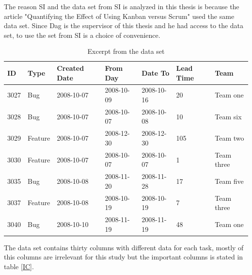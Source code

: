 \documentclass[UKenglish]{ifimaster}  %
\begin{document}
The reason SI and the data set from SI is analyzed in this thesis is because the article "Quantifying the Effect of Using Kanban versus Scrum" \parencite{Dag} used the same data set. Since Dag is the supervisor of this thesis and he had access to the data set, to use the set from SI is a choice of convenience. 

\begin{table}[!ht]
\begin{center}
\begin{tabular}{|l|l|l|l|l|l|l|}
\hline
ID	& Type &  Created Date & From Day & Date To & Lead Time & Team \\ \hline
    3027 & Bug & 2008-10-07 &  2008-10-09 & 2008-10-16 & 20 & Team one\\ \hline
   3028 & Bug  & 2008-10-07 & 2008-10-07 & 2008-10-08 & 10 & Team six\\ \hline
   3029 & Feature & 2008-10-07 &  2008-12-30	 & 2008-12-30 & 105 & Team two\\ \hline
    3030 & Feature & 2008-10-07 & 2008-10-07	& 2008-10-07 & 1& Team three\\ \hline
   3035 & Bug & 2008-10-08 & 2008-11-20 & 2008-11-28 & 17 & Team five\\ \hline
   3037 & Feature & 2008-10-08 &  2008-10-19	 & 2008-10-19 & 7 & Team three\\ \hline
   3040 & Bug & 2008-10-10 &  2008-11-19 & 2008-11-19 & 48 & Team one\\ \hline
   \end{tabular}
\caption{Excerpt from the data set}
\label{dataset}
\end{center}
\end{table}

The data set contains thirty columns with different data for each task, mostly of this columns are irrelevant for this study but the important columns is stated in table \ref{IC}.
\end{document}
